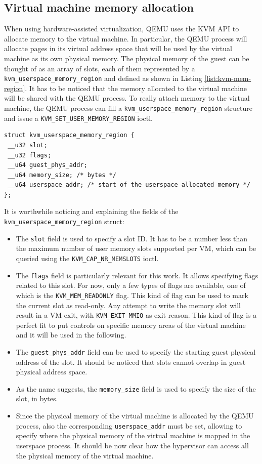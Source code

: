 \subsection{Virtual machine memory allocation}
When using hardware-assisted virtualization, QEMU uses the KVM API to allocate memory to the virtual machine. In particular, the QEMU process will allocate pages in its virtual address space that will be used by the virtual machine as its own physical memory. The physical memory of the guest can be thought of as an array of slots, each of them represented by a \texttt{kvm\_userspace\_memory\_region} and defined as shown in Listing  \ref{list:kvm-mem-region}. It has to be noticed that the memory allocated to the virtual machine will be shared with the QEMU process. To really attach memory to the virtual machine, the QEMU process can fill a \texttt{kvm\_userspace\_memory\_region} structure and issue a \texttt{KVM\_SET\_USER\_MEMORY\_REGION} ioctl. 
\begin{lstlisting}[style=c, caption={\texttt{kvm\_userspace\_memory\_region} struct}, label={list:kvm-mem-region}]
struct kvm_userspace_memory_region {
 __u32 slot;
 __u32 flags;
 __u64 guest_phys_addr;
 __u64 memory_size; /* bytes */
 __u64 userspace_addr; /* start of the userspace allocated memory */
};
\end{lstlisting}
It is worthwhile noticing and explaining the fields of the \texttt{kvm\_userspace\_memory\_region} struct:
\begin{itemize}
    \item The \texttt{slot} field is used to specify a slot ID. It has to be a number less than the maximum number of user memory slots supported per VM, which can be queried using the \texttt{KVM\_CAP\_NR\_MEMSLOTS} ioctl. 
    \item The \texttt{flags} field is particularly relevant for this work. It allows specifying flags related to this slot. For now, only a few types of flags are available, one of which is the \texttt{KVM\_MEM\_READONLY} flag. This kind of flag can be used to mark the current slot as read-only. Any attempt to write the memory slot will result in a VM exit, with \texttt{KVM\_EXIT\_MMIO} as exit reason. This kind of flag is a perfect fit to put controls on specific memory areas of the virtual machine and it will be used in the following. 
    \item The \texttt{guest\_phys\_addr} field can be used to specify the starting guest physical address of the slot. It should be noticed that slots cannot overlap in guest physical address space. 
    \item As the name suggests, the \texttt{memory\_size} field is used to specify the size of the slot, in bytes.
    \item Since the physical memory of the virtual machine is allocated by the QEMU process, also the corresponding \texttt{userspace\_addr} must be set, allowing to specify where the physical memory of the virtual machine is mapped in the userspace process. It should be now clear how the hypervisor can access all the physical memory of the virtual machine. 
\end{itemize}
